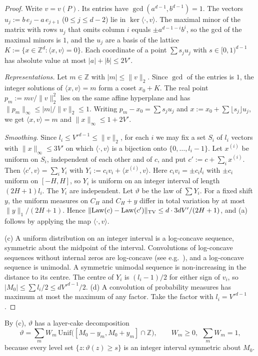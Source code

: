 \documentclass[11pt]{amsart}
\theoremstyle{definition}
\newcommand{\Z}{\mathbb{Z}}
\begin{document}
\begin{proof}
Write $v=v(P)$. Its entries have $\gcd(a^{d-1},b^{d-1})=1$. The vectors $u_j:=b\,e_j-a\,e_{j+1}$ ($0\le j\le d-2$)
lie in $\ker\langle\cdot,v\rangle$. The maximal minor of the matrix with rows $u_j$ that omits column $i$ equals
$\pm a^{d-1-i}b^i$, so the gcd of the maximal minors is $1$, and the $u_j$ are a basis of the lattice
$K:=\{x\in\Z^d:\langle x,v\rangle=0\}$. Each coordinate of a point $\sum s_ju_j$ with $s\in[0,1)^{d-1}$ has absolute value at most
$|a|+|b|\le2V'$.

\emph{Representations.} Let $m\in\Z$ with $|m|\le\|v\|_2$. Since $\gcd$ of the entries is $1$, the integer solutions of
$\langle x,v\rangle=m$ form a coset $x_0+K$. The real point $p_m:=mv/\|v\|_2^2$ lies on the same affine hyperplane and
has $\|p_m\|_\infty\le|m|/\|v\|_2\le1$. Writing $p_m-x_0=\sum s_ju_j$ and $x:=x_0+\sum\lfloor s_j\rfloor u_j$, we get
$\langle x,v\rangle=m$ and $\|x\|_\infty\le1+2V'$.

\emph{Smoothing.} Since $l_i\le V'^{d-1}\le\|v\|_2$, for each $i$ we may fix a set $S_i$ of $l_i$ vectors with
$\|x\|_\infty\le3V'$ on which $\langle\cdot,v\rangle$ is a bijection onto $\{0,\dots,l_i-1\}$. Let $x^{(i)}$ be uniform on $S_i$,
independent of each other and of $c$, and put $c':=c+\sum_ix^{(i)}$. Then
$\langle c',v\rangle=\sum_iY_i$ with $Y_i:=c_iv_i+\langle x^{(i)},v\rangle$. Here $c_iv_i=\pm c_il_i$ with $\pm c_i$ uniform on
$[-H,H]$, so $Y_i$ is uniform on an integer interval of length $(2H+1)l_i$. The $Y_i$ are independent. Let $\vartheta$ be the
law of $\sum Y_i$. For a fixed shift $y$, the uniform measures on $C_H$ and $C_H+y$ differ in total variation by
at most $\|y\|_1/(2H+1)$. Hence $\|\mathrm{Law}(c)-\mathrm{Law}(c')\|_{\rm TV}\le d\cdot3dV'/(2H+1)$, and (a) follows by
applying the map $\langle\cdot,v\rangle$.

(c) A uniform distribution on an integer interval is a log-concave sequence, symmetric about the midpoint of the
interval. Convolutions of log-concave sequences without internal zeros are log-concave (see e.g.\
\cite{stanley1989}), and a log-concave sequence is unimodal. A symmetric unimodal sequence is
non-increasing in the distance to its centre. The centre of $Y_i$ is $(l_i-1)/2$ for either sign of $v_i$, so $|M_0|\le\sum l_i/2\le dV'^{d-1}/2$.
(d) A convolution of probability measures has maximum at most the maximum of any factor. Take the factor with
$l_i=V'^{d-1}$.
\end{proof}

By (c), $\vartheta$ has a layer-cake decomposition
\begin{equation}\label{eq:layer}
\vartheta=\sum_mW_m\,\mathrm{Unif}\bigl([M_0-y_m,M_0+y_m]\cap\Z\bigr),\qquad W_m\ge0,\ \ \sum_mW_m=1,
\end{equation}
because every level set $\{z:\vartheta(z)\ge s\}$ is an integer interval symmetric about $M_0$.
\end{document}
